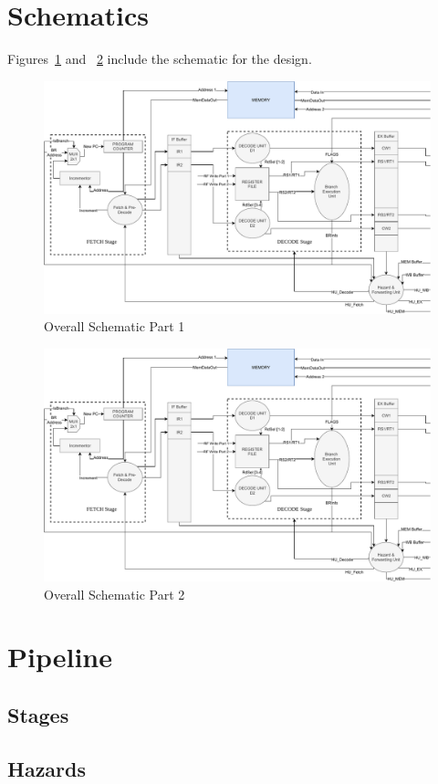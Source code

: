 \documentclass[12pt]{article}
\theoremstyle{plain}
\theoremstyle{definition}
\begin{document}
\section{Schematics}
    Figures~\ref{sys-schematic-1} and ~\ref{sys-schematic-2} include the schematic for the design.
    \pagebreak
    \begin{figure}
        \centering
        \includegraphics[page=1]{Diagrams/SystemOverviewSplit}
        \caption{Overall Schematic Part 1}
        \label{sys-schematic-1}
    \end{figure}
    \begin{figure}
        \centering
        \includegraphics[page=2]{Diagrams/SystemOverviewSplit}
        \caption{Overall Schematic Part 2}
        \label{sys-schematic-2}
    \end{figure}
\pagebreak

\section{Pipeline}
\subsection{Stages}
\subsection{Hazards}


			
\end{document}

